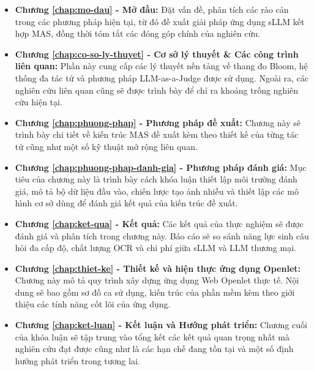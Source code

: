 \begin{itemize}
    \item \textbf{Chương \ref{chap:mo-dau} - Mở đầu:} Đặt vấn đề, phân tích các rào cản trong các phương pháp hiện tại, từ đó đề xuất giải pháp ứng dụng sLLM kết hợp MAS, đồng thời tóm tắt các đóng góp chính của nghiên cứu.

    \item \textbf{Chương \ref{chap:co-so-ly-thuyet} - Cơ sở lý thuyết \& Các công trình liên quan:} Phần này cung cấp các lý thuyết nền tảng về thang đo Bloom, hệ thống đa tác tử và phương pháp LLM-as-a-Judge được sử dụng. Ngoài ra, các nghiên cứu liên quan cũng sẽ được trình bày để chỉ ra khoảng trống nghiên cứu hiện tại.

    \item \textbf{Chương \ref{chap:phuong-phap} - Phương pháp đề xuất:} Chương này sẽ trình bày chi tiết về kiến trúc MAS đề xuất kèm theo thiết kế của từng tác tử cũng như một số kỹ thuật mở rộng liên quan.

    \item \textbf{Chương \ref{chap:phuong-phap-danh-gia} - Phương pháp đánh giá:} Mục tiêu của chương này là trình bày cách khóa luận thiết lập môi trường đánh giá, mô tả bộ dữ liệu đầu vào, chiến lược tạo ảnh nhiễu và thiết lập các mô hình cơ sở dùng để đánh giá kết quả của kiến trúc đề xuất.

    \item \textbf{Chương \ref{chap:ket-qua} - Kết quả:} Các kết quả của thực nghiệm sẽ được đánh giá và phân tích trong chương này. Báo cáo sẽ so sánh năng lực sinh câu hỏi đa cấp độ, chất lượng OCR và chi phí giữa sLLM và LLM thương mại.

    \item \textbf{Chương \ref{chap:thiet-ke} - Thiết kế và hiện thực ứng dụng Openlet:} Chương này mô tả quy trình xây dựng ứng dụng Web Openlet thực tế. Nội dung sẽ bao gồm sơ đồ ca sử dụng, kiến trúc của phần mềm kèm theo giới thiệu các tính năng cốt lõi của ứng dụng.

    \item \textbf{Chương \ref{chap:ket-luan} - Kết luận và Hướng phát triển:} Chương cuối của khóa luận sẽ tập trung vào tổng kết các kết quả quan trọng nhất mà nghiên cứu đạt được cũng như là các hạn chế đang tồn tại và một số định hướng phát triển trong tương lai.
\end{itemize}
